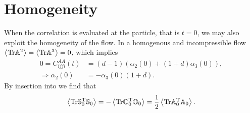 \documentclass[thesis.tex]{subfiles}
\begin{document}
\section{Homogeneity}
When the correlation is evaluated at the particle, that is $t=0$, we may also exploit the homogeneity of the flow. In a homogenous and incompressible flow $\left\langle \mbox{Tr} \mathbb{A}^2\right\rangle = \left\langle \mbox{Tr} \mathbb{A}^3\right\rangle=0 $, which implies
\begin{align*}
0=C^{AA}_{ijji}(t) &= (d-1)(\alpha_2(0) + (1+d)\alpha_3(0)),\\
\Rightarrow \alpha_2(0) &= -\alpha_3(0)(1+d).
\end{align*}
By insertion into  we find that
\begin{align*}
	\left\langle \mbox{Tr} \mathbb{S}_0^{\mathrm T}\mathbb{S}_0\right\rangle = -\left\langle \mbox{Tr} \mathbb{O}_0^{\mathrm T}\mathbb{O}_0\right\rangle = \frac{1}{2}\left\langle \mbox{Tr} \mathbb{A}_0^{\mathrm T}\mathbb{A}_0\right\rangle.
\end{align*}
\end{document}
